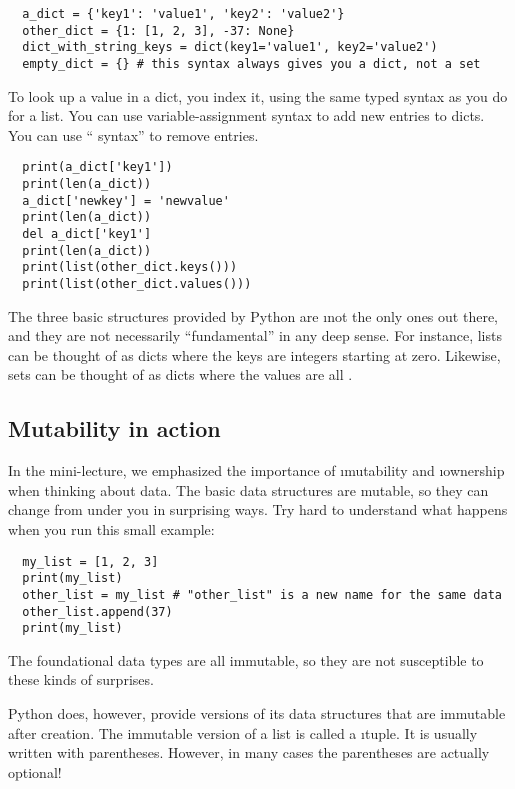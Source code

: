 \documentclass[letterpaper, 12pt, titlepage, twoside]{article}
\begin{document}
\begin{lstlisting}
  a_dict = {'key1': 'value1', 'key2': 'value2'}
  other_dict = {1: [1, 2, 3], -37: None}
  dict_with_string_keys = dict(key1='value1', key2='value2')
  empty_dict = {} # this syntax always gives you a dict, not a set
\end{lstlisting}

To look up a value in a dict, you index it, using the same typed syntax as you
do for a list. You can use variable-assignment syntax to add new entries to
dicts. You can use `` syntax'' to remove entries.

\begin{lstlisting}
  print(a_dict['key1'])
  print(len(a_dict))
  a_dict['newkey'] = 'newvalue'
  print(len(a_dict))
  del a_dict['key1']
  print(len(a_dict))
  print(list(other_dict.keys()))
  print(list(other_dict.values()))
\end{lstlisting}

The three basic structures provided by Python are \i{not} the only ones out
there, and they are not necessarily ``fundamental'' in any deep sense. For
instance, lists can be thought of as dicts where the keys are integers
starting at zero. Likewise, sets can be thought of as dicts where the values
are all .

\subsection*{Mutability in action}

In the mini-lecture, we emphasized the importance of \i{mutability} and
\i{ownership} when thinking about data. The basic data structures are mutable,
so they can change from under you in surprising ways. Try hard to understand
what happens when you run this small example:

\begin{lstlisting}
  my_list = [1, 2, 3]
  print(my_list)
  other_list = my_list # "other_list" is a new name for the same data
  other_list.append(37)
  print(my_list)
\end{lstlisting}

The foundational data types are all immutable, so they are not susceptible to
these kinds of surprises.

Python does, however, provide versions of its data structures that are
immutable after creation. The immutable version of a list is called a
\i{tuple}. It is usually written with parentheses. However, in many cases the
parentheses are actually optional!
\end{document}
